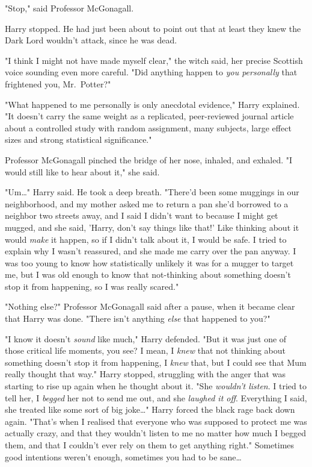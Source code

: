 "Stop," said Professor McGonagall.

Harry stopped. He had just been about to point out that at least they knew the 
Dark Lord wouldn't attack, since he was dead.

"I think I might not have made myself clear," the witch said, her precise 
Scottish voice sounding even more careful. "Did anything happen to \emph{you 
personally} that frightened you, Mr.~Potter?"

"What happened to me personally is only anecdotal evidence," Harry explained. 
"It doesn't carry the same weight as a replicated, peer-reviewed journal 
article about a controlled study with random assignment, many subjects, large 
effect sizes and strong statistical significance."

Professor McGonagall pinched the bridge of her nose, inhaled, and exhaled. "I 
would still like to hear about it," she said.

"Um{\ldots}" Harry said. He took a deep breath. "There'd been some muggings in 
our neighborhood, and my mother asked me to return a pan she'd borrowed to a 
neighbor two streets away, and I said I didn't want to because I might get 
mugged, and she said, 'Harry, don't say things like that!' Like thinking about 
it would \emph{make} it happen, so if I didn't talk about it, I would be safe. 
I tried to explain why I wasn't reassured, and she made me carry over the pan 
anyway. I was too young to know how statistically unlikely it was for a mugger 
to target me, but I was old enough to know that not-thinking about something 
doesn't stop it from happening, so I was really scared."

"Nothing else?" Professor McGonagall said after a pause, when it became clear 
that Harry was done. "There isn't anything \emph{else} that happened to you?"

"I know it doesn't \emph{sound} like much," Harry defended. "But it was just 
one of those critical life moments, you see? I mean, I \emph{knew} that not 
thinking about something doesn't stop it from happening, I \emph{knew} that, 
but I could see that Mum really thought that way." Harry stopped, struggling 
with the anger that was starting to rise up again when he thought about it. 
"She \emph{wouldn't listen}. I tried to tell her, I \emph{begged} her not to 
send me out, and she \emph{laughed it off}. Everything I said, she treated like 
some sort of big joke{\ldots}" Harry forced the black rage back down again. 
"That's when I realised that everyone who was supposed to protect me was 
actually crazy, and that they wouldn't listen to me no matter how much I begged 
them, and that I couldn't ever rely on them to get anything right." Sometimes 
good intentions weren't enough, sometimes you had to be sane{\ldots}

